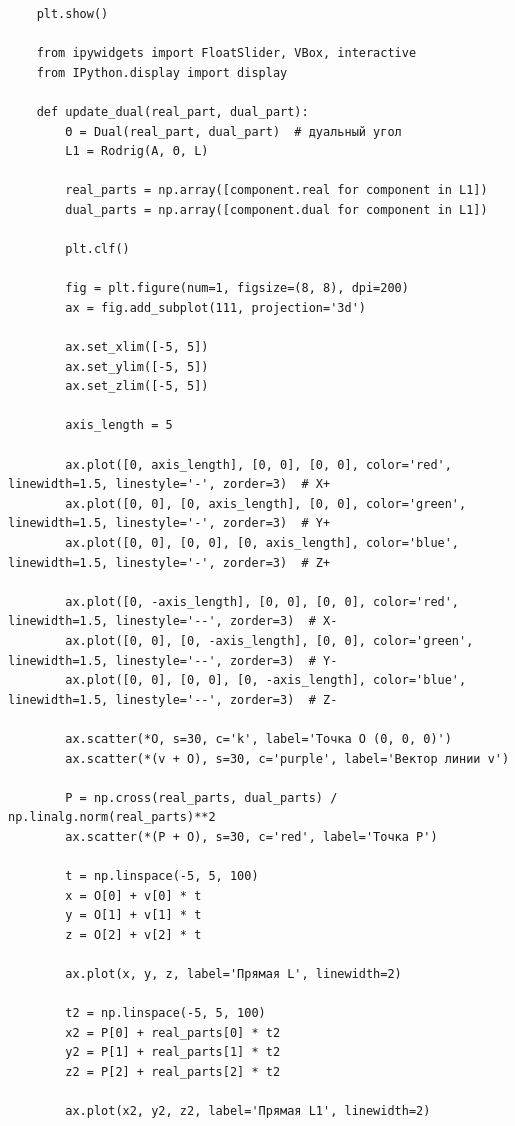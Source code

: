 \begin{verbatim}
    plt.show()

    from ipywidgets import FloatSlider, VBox, interactive
    from IPython.display import display

    def update_dual(real_part, dual_part):
        Θ = Dual(real_part, dual_part)  # дуальный угол
        L1 = Rodrig(A, Θ, L)  

        real_parts = np.array([component.real for component in L1])
        dual_parts = np.array([component.dual for component in L1])

        plt.clf()

        fig = plt.figure(num=1, figsize=(8, 8), dpi=200)
        ax = fig.add_subplot(111, projection='3d')

        ax.set_xlim([-5, 5])
        ax.set_ylim([-5, 5])
        ax.set_zlim([-5, 5])

        axis_length = 5

        ax.plot([0, axis_length], [0, 0], [0, 0], color='red', linewidth=1.5, linestyle='-', zorder=3)  # X+
        ax.plot([0, 0], [0, axis_length], [0, 0], color='green', linewidth=1.5, linestyle='-', zorder=3)  # Y+
        ax.plot([0, 0], [0, 0], [0, axis_length], color='blue', linewidth=1.5, linestyle='-', zorder=3)  # Z+

        ax.plot([0, -axis_length], [0, 0], [0, 0], color='red', linewidth=1.5, linestyle='--', zorder=3)  # X-
        ax.plot([0, 0], [0, -axis_length], [0, 0], color='green', linewidth=1.5, linestyle='--', zorder=3)  # Y-
        ax.plot([0, 0], [0, 0], [0, -axis_length], color='blue', linewidth=1.5, linestyle='--', zorder=3)  # Z-

        ax.scatter(*O, s=30, c='k', label='Точка O (0, 0, 0)')
        ax.scatter(*(v + O), s=30, c='purple', label='Вектор линии v')
        
        P = np.cross(real_parts, dual_parts) / np.linalg.norm(real_parts)**2
        ax.scatter(*(P + O), s=30, c='red', label='Точка P')

        t = np.linspace(-5, 5, 100)  
        x = O[0] + v[0] * t
        y = O[1] + v[1] * t
        z = O[2] + v[2] * t

        ax.plot(x, y, z, label='Прямая L', linewidth=2)

        t2 = np.linspace(-5, 5, 100)  
        x2 = P[0] + real_parts[0] * t2
        y2 = P[1] + real_parts[1] * t2
        z2 = P[2] + real_parts[2] * t2

        ax.plot(x2, y2, z2, label='Прямая L1', linewidth=2)


\end{verbatim}
